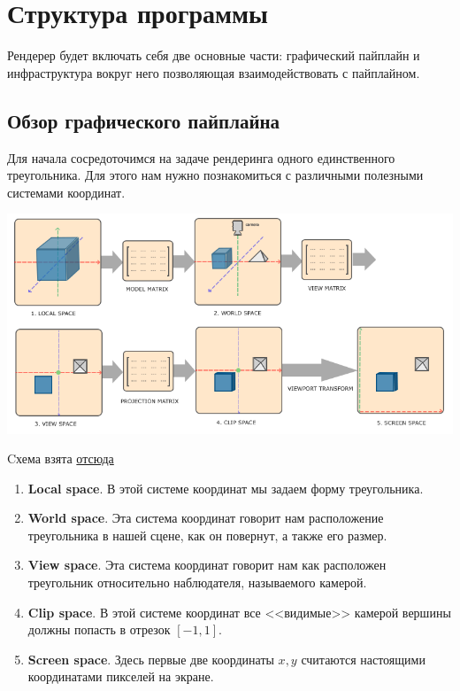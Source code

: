 \documentclass{article}
\begin{document}
\section{Структура программы}

Рендерер будет включать себя две основные части: графический пайплайн 
и инфраструктура вокруг него позволяющая взаимодействовать с пайплайном. 

\subsection{Обзор графического пайплайна}

Для начала сосредоточимся на задаче рендеринга одного единственного 
треугольника. Для этого нам нужно познакомиться с различными полезными 
системами координат.

\begin{center}
\includegraphics[scale = 0.6]{coordinate_systems.png}

Cхема взята \href{https://learnopengl.com/Getting-started/Coordinate-Systems}{отсюда}
\end{center}

\begin{enumerate}
    \item \textbf{Local space}.
    В этой системе координат мы задаем форму треугольника.
    \item \textbf{World space}.
    Эта система координат говорит нам расположение треугольника в нашей сцене, как 
    он повернут, а также его размер.
    \item \textbf{View space}.
    Эта система координат говорит нам как расположен треугольник 
    относительно наблюдателя, называемого камерой.
    \item \textbf{Clip space}.
    В этой системе координат все <<видимые>> камерой вершины должны 
    попасть в отрезок $[-1, 1]$. 
    \item \textbf{Screen space}. Здесь первые 
    две координаты $x, y$ считаются настоящими координатами пикселей на экране.
\end{enumerate}
\end{document}
